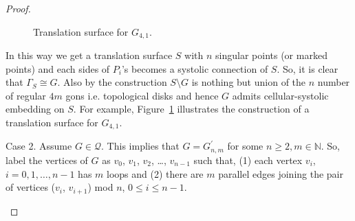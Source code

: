 \documentclass[11pt]{amsart}
\newcommand{\N}{\mathbb{N}}
\theoremstyle{plain}
\theoremstyle{definition}
\theoremstyle{remark}
\numberwithin{equation}{section}
\numberwithin{figure}{section}
\begin{document}
\begin{proof}
\begin{figure}[htbp]
\begin{center}
\caption{Translation surface for $G_{4,1}$.}
\label{figure16}
\end{center}
\end{figure}

In this way we get a translation surface $S$ with $n$ singular points (or marked points) and each sides of $P_i$'s becomes a systolic connection of $S$. So, it is clear that $\Gamma_S \cong G$. Also by the construction $S\setminus G$ is nothing but union of the $n$ number of regular $4m$ gons i.e. topological disks and hence $G$ admits cellular-systolic embedding on $S$.
 For example, Figure~\ref{figure16} illustrates the construction of a translation surface for $G_{4,1}$.


Case 2.
Assume $G\in \mathcal{Q}$.
This implies that $G=G_{n,m}^\prime$ for some $n\ge2, m\in \N$.
 So, label the vertices of $G$ as $v_0$, $v_1$, $v_2$, \dots, $v_{n-1}$ such that,
 (1) each vertex $v_i$, $i= 0,1,\dots, n-1$ has $m$ loops and  
 (2) there are $m$ parallel edges joining the pair of vertices ($v_i$, $v_{i+1}$) mod $n$, $0\le i\le n-1$.
 \begin{figure}[htbp]
\begin{center}
\end{center}
\end{figure}
\end{proof}
\end{document}
